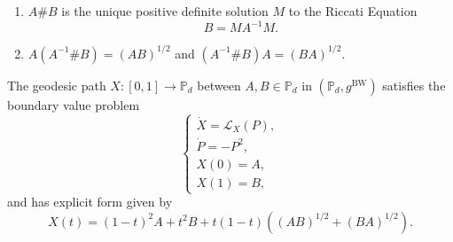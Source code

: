 \documentclass[10pt,a4paper]{amsart}
\begin{document}
\begin{lemma}\label{lem:geometric_mean_riccati}
\begin{enumerate}
    \item $A\#B$ is the unique positive definite solution $M$ to the Riccati Equation
    \begin{equation}
        B = MA^{-1}M.
    \end{equation}
    \item $A(A^{-1}\#B) = (AB)^{1/2}$ and $(A^{-1}\#B)A = (BA)^{1/2}$.
\end{enumerate}
\end{lemma}

\begin{theorem}\label{thm:bw_general_case}
    The geodesic path $X: [0,1] \to \mathbb{P}_d$ between $A, B \in \mathbb{P}_d$ in $(\mathbb{P}_d, g^\text{BW})$ satisfies the boundary value problem
    \begin{equation}\label{eq:bures_wasserstein_equations}
        \begin{cases}
            \dot{X} = \mathcal{L}_X(P), \\
            \dot{P} = -P^2,\\
            X(0) = A,\\
            X(1) = B,
        \end{cases}
    \end{equation}
    and has explicit form given by
\begin{equation}
    X(t) = (1-t)^2 A + t^2 B + t(1-t)\left((AB)^{1/2} + (BA)^{1/2}\right).
\end{equation}
\end{theorem}
\end{document}
